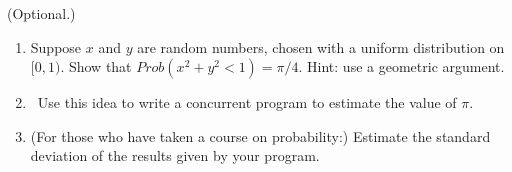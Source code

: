 \begin{nontutequestion}
(Optional.)
\begin{enumerate}
\item
Suppose $x$ and $y$ are random numbers, chosen with a uniform distribution on
$[0,1)$.  Show that $Prob(x^2+y^2<1) = \pi/4$.  Hint: use a geometric
  argument.

\item
\Programming\ 
Use this idea to write a concurrent program to estimate the value of $\pi$.

\item
(For those who have taken a course on probability:) Estimate the
  standard deviation of the results given by your program.
\end{enumerate}
\end{nontutequestion}


